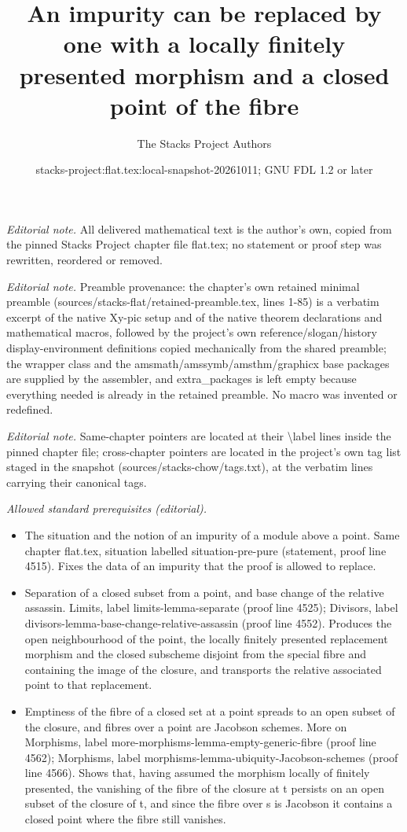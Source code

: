 \documentclass[10pt,a4paper]{amsart}
\title{An impurity can be replaced by one with a locally finitely presented morphism and a closed point of the fibre}
\author{The Stacks Project Authors}
\date{stacks-project:flat.tex:local-snapshot-20261011; GNU FDL 1.2 or later}
\theoremstyle{plain}
\theoremstyle{definition}
\theoremstyle{remark}
\numberwithin{equation}{subsection}
\begin{document}
\maketitle
\noindent\textit{Editorial note.} All delivered mathematical text is the author's own, copied from the pinned Stacks Project chapter file flat.tex; no statement or proof step was rewritten, reordered or removed.\par\medskip
\noindent\textit{Editorial note.} Preamble provenance: the chapter's own retained minimal preamble (sources/stacks-flat/retained-preamble.tex, lines 1-85) is a verbatim excerpt of the native Xy-pic setup and of the native theorem declarations and mathematical macros, followed by the project's own reference/slogan/history display-environment definitions copied mechanically from the shared preamble; the wrapper class and the amsmath/amssymb/amsthm/graphicx base packages are supplied by the assembler, and extra\_packages is left empty because everything needed is already in the retained preamble. No macro was invented or redefined.\par\medskip
\noindent\textit{Editorial note.} Same-chapter pointers are located at their \textbackslash{}label lines inside the pinned chapter file; cross-chapter pointers are located in the project's own tag list staged in the snapshot (sources/stacks-chow/tags.txt), at the verbatim lines carrying their canonical tags.\par\medskip
\noindent\textit{Allowed standard prerequisites (editorial).}\begin{itemize}
\item The situation and the notion of an impurity of a module above a point. Same chapter flat.tex, situation labelled situation-pre-pure (statement, proof line 4515). Fixes the data of an impurity that the proof is allowed to replace.
\item Separation of a closed subset from a point, and base change of the relative assassin. Limits, label limits-lemma-separate (proof line 4525); Divisors, label divisors-lemma-base-change-relative-assassin (proof line 4552). Produces the open neighbourhood of the point, the locally finitely presented replacement morphism and the closed subscheme disjoint from the special fibre and containing the image of the closure, and transports the relative associated point to that replacement.
\item Emptiness of the fibre of a closed set at a point spreads to an open subset of the closure, and fibres over a point are Jacobson schemes. More on Morphisms, label more-morphisms-lemma-empty-generic-fibre (proof line 4562); Morphisms, label morphisms-lemma-ubiquity-Jacobson-schemes (proof line 4566). Shows that, having assumed the morphism locally of finitely presented, the vanishing of the fibre of the closure at t persists on an open subset of the closure of t, and since the fibre over s is Jacobson it contains a closed point where the fibre still vanishes.
\end{itemize}\medskip
\end{document}

